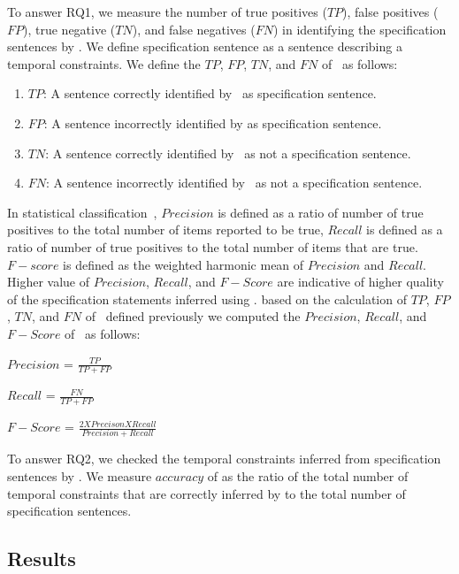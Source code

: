  


To answer RQ1, we measure the number of true positives ($TP$), false positives ($FP$), true negative ($TN$), and false negatives ($FN$)
in identifying the specification sentences by \tool.
We define specification sentence as a sentence describing a temporal constraints.
We define the $TP$, $FP$, $TN$, and $FN$ of \tool\ as follows:

\begin{enumerate}
	\item $TP$: A sentence correctly identified by \tool\ as specification sentence.
	\item $FP$: A sentence incorrectly identified by \tool as specification sentence.
	\item $TN$: A sentence correctly identified by \tool\ as not a specification sentence.
	\item $FN$: A sentence incorrectly identified by \tool\ as not a specification sentence.
\end{enumerate}


In statistical classification~\cite{Olson08}, $Precision$ is defined as a ratio of
number of true positives to the total number of items reported to be true,
$Recall$ is defined as a ratio of number of true positives to the total number
of items that are true. $F-score$ is defined as the weighted harmonic mean of 
$Precision$ and $Recall$. Higher value of $Precision$, $Recall$, and $F-Score$
are indicative of higher quality of the specification statements inferred using 
\tool. based on the calculation of $TP$, $FP$, $TN$, and $FN$ of \tool\ defined
previously we computed the $Precision$, $Recall$, and $F-Score$ of \tool\ as follows:


\begin{center}

$Precision$ = $\frac{TP}{TP + FP}$

$Recall$ = $\frac{FN}{TP + FP}$

$F-Score$ = $\frac{2 X Precison X Recall}{Precision + Recall}$

\end{center}

To answer RQ2, we checked the temporal constraints inferred from specification sentences by \tool.
We measure $accuracy$ of \tool as the ratio of the total number of temporal constraints that
are correctly inferred by \tool to the total number of specification sentences. 

\subsection{Results}

